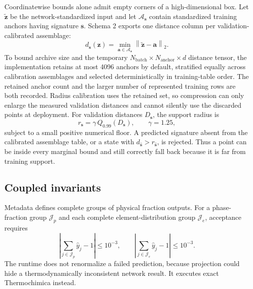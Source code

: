 \documentclass[11pt]{article}
\newcommand{\norm}[1]{\left\lVert #1\right\rVert_2}
\newcommand{\abs}[1]{\left\lvert #1\right\rvert}
\begin{document}
Coordinatewise bounds alone admit empty corners of a high-dimensional box.  Let
\(\widetilde{\boldsymbol{z}}\) be the network-standardized input and let
\(\mathcal{A}_{\boldsymbol{s}}\) contain standardized training anchors having signature
\(\boldsymbol{s}\).  Schema 2 exports one distance column per validation-calibrated assemblage:
\begin{equation}
  d_{\boldsymbol{s}}(\boldsymbol{z})
  =\min_{\boldsymbol{a}\in\mathcal{A}_{\boldsymbol{s}}}
    \norm{\widetilde{\boldsymbol{z}}-\boldsymbol{a}}.
  \label{eq:assemblage-distance}
\end{equation}
To bound archive size and the temporary
\(N_{\mathrm{batch}}\times N_{\mathrm{anchor}}\times d\) distance tensor, the implementation
retains at most 4096 anchors by default, stratified equally across calibration assemblages and
selected deterministically in training-table order.  The retained anchor count and the larger
number of represented training rows are both recorded.  Radius calibration uses the retained
set, so compression can only enlarge the measured validation distances and cannot silently use
the discarded points at deployment.
For validation distances \(D_{\boldsymbol{s}}\), the support radius is
\begin{equation}
  r_{\boldsymbol{s}}
  =\gamma\,Q_{0.99}(D_{\boldsymbol{s}}),\qquad \gamma=1.25,
  \label{eq:support-radius}
\end{equation}
subject to a small positive numerical floor.  A predicted signature absent from the calibrated
assemblage table, or a state with
\(d_{\widehat{\boldsymbol{s}}}>r_{\widehat{\boldsymbol{s}}}\), is rejected.  Thus a point can be
inside every marginal bound and still correctly fall back because it is far from training support.

\subsection{Coupled invariants}

Metadata defines complete groups of physical fraction outputs.  For a phase-fraction group
\(\mathcal{J}_{p}\) and each complete element-distribution group
\(\mathcal{J}_{e}\), acceptance requires
\begin{equation}
  \abs{\sum_{j\in\mathcal{J}_{p}}\widehat y_j-1}\leq10^{-3},
  \qquad
  \abs{\sum_{j\in\mathcal{J}_{e}}\widehat y_j-1}\leq10^{-3}.
  \label{eq:coupled-invariants}
\end{equation}
The runtime does not renormalize a failed prediction, because projection could hide a
thermodynamically inconsistent network result.  It executes exact Thermochimica instead.
\end{document}
